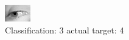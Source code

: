 \begin{figure}[h!]
\begin{center}
\includegraphics[width=0.60\columnwidth]{figures/ID2996_class_3_target_4.png}
\end{center}
\caption{ Classification: 3 actual target: 4}
\label{fig:ID2996_class_3_target_4}
\end{figure}
